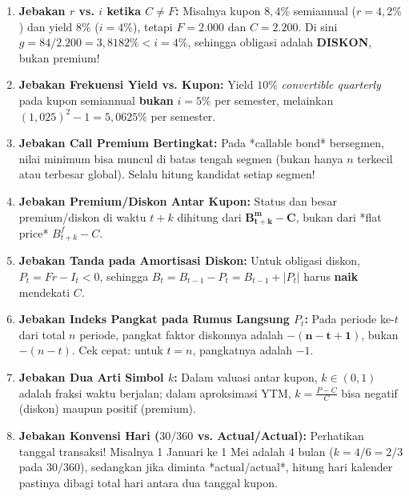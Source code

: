 \documentclass[10pt,a4paper]{article}
\begin{document}
\begin{jebakanbox}
\begin{enumerate}[leftmargin=1.5em, topsep=1pt, itemsep=1.5pt]
    \item \textbf{Jebakan $r$ vs. $i$ ketika $C \neq F$:} Misalnya kupon $8{,}4\%$ semiannual ($r = 4{,}2\%$) dan yield $8\%$ ($i = 4\%$), tetapi $F = 2.000$ dan $C = 2.200$. Di sini $g = 84/2.200 = 3{,}8182\% < i = 4\%$, sehingga obligasi adalah \textbf{DISKON}, bukan premium!
    \item \textbf{Jebakan Frekuensi Yield vs. Kupon:} Yield $10\%$ \textit{convertible quarterly} pada kupon semiannual \textbf{bukan} $i = 5\%$ per semester, melainkan $(1{,}025)^2 - 1 = 5{,}0625\%$ per semester.
    \item \textbf{Jebakan Call Premium Bertingkat:} Pada *callable bond* bersegmen, nilai minimum bisa muncul di batas tengah segmen (bukan hanya $n$ terkecil atau terbesar global). Selalu hitung kandidat setiap segmen!
    \item \textbf{Jebakan Premium/Diskon Antar Kupon:} Status dan besar premium/diskon di waktu $t+k$ dihitung dari $\mathbf{B_{t+k}^m - C}$, bukan dari *flat price* $B_{t+k}^f - C$.
    \item \textbf{Jebakan Tanda pada Amortisasi Diskon:} Untuk obligasi diskon, $P_t = Fr - I_t < 0$, sehingga $B_t = B_{t-1} - P_t = B_{t-1} + |P_t|$ harus \textbf{naik} mendekati $C$.
    \item \textbf{Jebakan Indeks Pangkat pada Rumus Langsung $P_t$:} Pada periode ke-$t$ dari total $n$ periode, pangkat faktor diskonnya adalah $\mathbf{-(n - t + 1)}$, bukan $-(n - t)$. Cek cepat: untuk $t = n$, pangkatnya adalah $-1$.
    \item \textbf{Jebakan Dua Arti Simbol $k$:} Dalam valuasi antar kupon, $k \in (0, 1)$ adalah fraksi waktu berjalan; dalam aproksimasi YTM, $k = \frac{P-C}{C}$ bisa negatif (diskon) maupun positif (premium).
    \item \textbf{Jebakan Konvensi Hari ($30/360$ vs. Actual/Actual):} Perhatikan tanggal transaksi! Misalnya 1 Januari ke 1 Mei adalah $4$ bulan ($k = 4/6 = 2/3$ pada $30/360$), sedangkan jika diminta *actual/actual*, hitung hari kalender pastinya dibagi total hari antara dua tanggal kupon.
\end{enumerate}
\end{jebakanbox}
\end{document}
